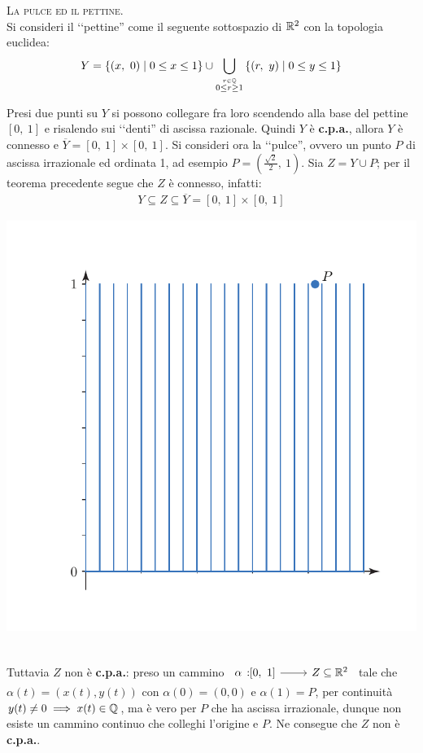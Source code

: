 \begin{example}\textsc{La pulce ed il pettine.}\\
	Si consideri il ‘‘pettine'' come il seguente sottospazio di $\mathbb{R} ^2$ con la topologia euclidea:
		\begin{equation*}
			Y= \left\{ (x,\ 0) \mid 0\leq x\leq 1 \right\} \cup \mathop{{\bigcup}}\displaylimits_{\stackrel{r\in\mathbb{Q}}{ 0\leq r\geq 1}} \left\{ (r,\ y) \mid 0\leq y \leq 1 \right\}
		\end{equation*}
\begin{minipage}{0.62\textwidth}
Presi due punti su $Y$ si possono collegare fra loro scendendo alla base del pettine $\left[0,\ 1\right]$ e risalendo sui ‘‘denti'' di ascissa razionale. Quindi $Y$ è \textbf{c.p.a.}, allora $Y$ è connesso e $\overline{Y}=\left[0,\ 1\right]\times \left[0,\ 1\right]$.\newline
Si consideri ora la ‘‘pulce'', ovvero un punto $P$ di ascissa irrazionale ed ordinata 1, ad esempio $P=\left(\frac{\sqrt{2}}{2},\ 1\right)$. Sia $Z=Y\cup P$; per il teorema precedente segue che $Z$ è connesso, infatti:
\begin{gather*}
	Y\subseteq Z \subseteq \overline{Y}=\left[0,\ 1\right]\times \left[0,\ 1\right]	
\end{gather*}
	\end{minipage}
	\begin{minipage}{0.37\textwidth}
		\includegraphics[trim=1.1cm 0.5cm 0.5cm 1.25cm,clip,scale=0.50]{images/comb.pdf}
	\end{minipage}\\
Tuttavia $Z$ non è \textbf{c.p.a.}: preso un cammino $\funz \alpha {\left[0,\ 1\right]} {Z\subseteq \realset^2}$ tale che $\alpha(t)= \left( x(t), y(t)\right)$ con $\alpha (0)=(0,0)$ e $\alpha(1)=P$, per continuità $y(t)\neq 0 \implies x(t)\in\mathbb{Q}$, ma è vero per $P$ che ha ascissa irrazionale, dunque non esiste un cammino continuo che colleghi l'origine e $P$. Ne consegue che $Z$ non è \textbf{c.p.a.}.
\end{example}

